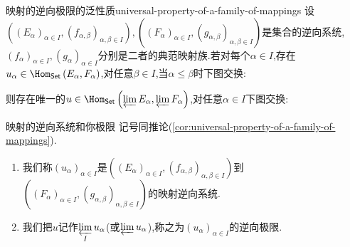 \begin{corollary}{映射的逆向极限的泛性质}{universal-property-of-a-family-of-mappings}
	设$\left(\left(E_{\alpha}\right)_{\alpha\in I},\left(f_{\alpha,\beta}\right)_{\alpha,\beta\in I}\right),\left(\left(F_{\alpha}\right)_{\alpha\in I},\left(g_{\alpha,\beta}\right)_{\alpha,\beta\in I}\right)$是集合的逆向系统,$\left(f_{\alpha}\right)_{\alpha\in I},\left(g_{\alpha}\right)_{\alpha\in I}$分别是二者的典范映射族.若对每个$\alpha\in I$,存在$u_{\alpha}\in\Hom_{\mathsf{Set}}\left(E_{\alpha},F_{\alpha}\right)$,对任意$\beta\in I$,当$\alpha\leq\beta$时下图交换:
	\begin{center}
	\end{center}
	则存在唯一的$u\in\Hom_{\mathsf{Set}}\left(\varprojlim E_{\alpha},\varprojlim F_{\alpha}\right)$,对任意$\alpha\in I$下图交换:
	\begin{center}
	\end{center}
\end{corollary}

\begin{definition}{映射的逆向系统和你极限}{}
	记号同推论(\ref{cor:universal-property-of-a-family-of-mappings}).
	\begin{enumerate}
		\item 我们称$\left(u_{\alpha}\right)_{\alpha\in I}$是$\left(\left(E_{\alpha}\right)_{\alpha\in I},\left(f_{\alpha,\beta}\right)_{\alpha,\beta\in I}\right)$到$\left(\left(F_{\alpha}\right)_{\alpha\in I},\left(g_{\alpha,\beta}\right)_{\alpha,\beta\in I}\right)$的映射逆向系统.
		\item 我们把$u$记作$\varprojlim\limits_{I}u_{\alpha}$(或$\varprojlim u_{\alpha}$),称之为$\left(u_{\alpha}\right)_{\alpha\in I}$的逆向极限.
	\end{enumerate}
\end{definition}

